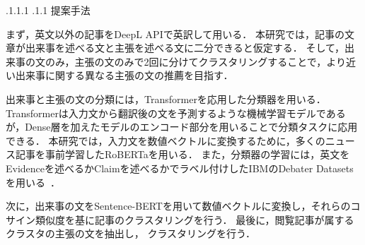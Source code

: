 \documentclass[a4paper, twocolumn, 10pt]{jarticle}
\makeatletter
\def\section{%
	\@startsection{section}{1}{\z@}%
	{.1\Cvs \@plus.1\Cdp \@minus.1\Cdp}%
	{.1\Cvs \@plus.1\Cdp}%
	{\normalfont\normalsize\bfseries}%
}
\makeatother
\begin{document}


\section{提案手法}

まず，英文以外の記事をDeepL APIで英訳して用いる．
本研究では，記事の文章が出来事を述べる文と主張を述べる文に二分できると仮定する．
そして，出来事の文のみ，主張の文のみで2回に分けてクラスタリングすることで，より近い出来事に関する異なる主張の文の推薦を目指す．

出来事と主張の文の分類には，Transformerを応用した分類器を用いる．Transformerは入力文から翻訳後の文を予測するような機械学習モデルであるが，Dense層を加えたモデルのエンコード部分を用いることで分類タスクに応用できる．
本研究では，入力文を数値ベクトルに変換するために，多くのニュース記事を事前学習したRoBERTaを用いる．
また，分類器の学習には，英文をEvidenceを述べるかClaimを述べるかでラベル付けしたIBMのDebater Datasetsを用いる~\cite{debater_datasets}．


次に，出来事の文をSentence-BERTを用いて数値ベクトルに変換し，それらのコサイン類似度を基に記事のクラスタリングを行う．
最後に，閲覧記事が属するクラスタの主張の文を抽出し，
クラスタリングを行う．
\end{document}
